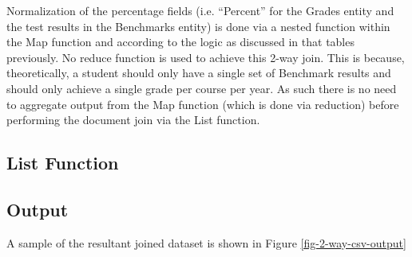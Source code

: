 Normalization of the percentage fields (i.e. ``Percent'' for the Grades entity and the test results in the Benchmarks entity) is done via a nested function within the Map function and according to the logic as discussed in that tables previously. No reduce function is used to achieve this 2-way join. This is because, theoretically, a student should only have a single set of Benchmark results and should only achieve a single grade per course per year. As such there is no need to aggregate output from the Map function (which is done via reduction) before performing the document join via the List function.



\subsection{List Function}



\subsection{Output}
A sample of the resultant joined dataset is shown in Figure \ref{fig-2-way-csv-output}
